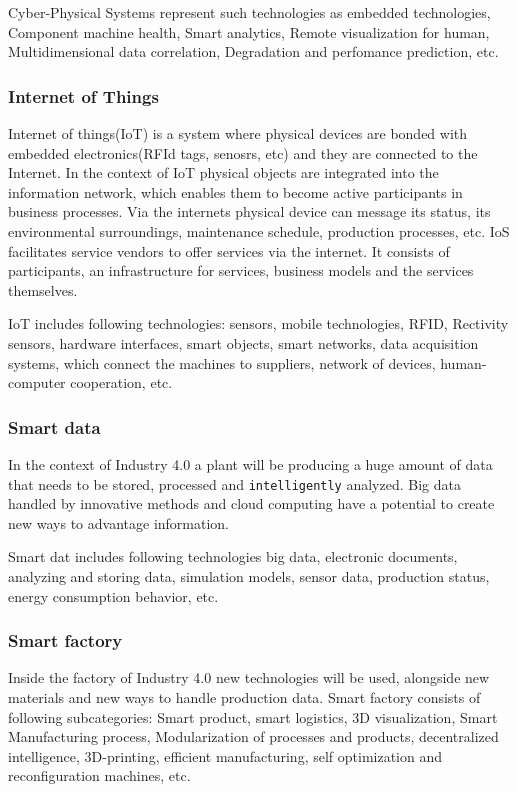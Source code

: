 \documentclass[thesis=B,english]{FITthesis}[2019/12/23]
\begin{document}
Cyber-Physical Systems represent such technologies as embedded technologies, Component machine health, Smart analytics, Remote visualization for human, Multidimensional data correlation, Degradation and perfomance prediction, etc.

\subsubsection{Internet of Things}

Internet of things(IoT) is a system where physical devices are bonded with embedded electronics(RFId tags, senosrs, etc) and they are connected to the Internet. In the context of IoT physical objects are integrated into the information network, which enables them to become active participants in business processes. Via the internets physical device can message its status, its environmental surroundings, maintenance schedule, production processes, etc. IoS facilitates service vendors to offer  services via the internet. It consists of participants, an infrastructure for services, business models and the services themselves.  

IoT includes following technologies: sensors, mobile technologies, RFID, Rectivity sensors, hardware interfaces, smart objects, smart networks, data acquisition systems, which connect the machines to suppliers, network of devices, human-computer cooperation, etc. 

\subsubsection{Smart data}

In the context of Industry 4.0 a plant will be producing a huge amount of data that needs to be stored, processed and \verb|intelligently| analyzed. Big data handled by innovative methods and cloud computing have a potential to create new ways to advantage information.

Smart dat includes following technologies big data, electronic documents, analyzing and storing data, simulation models, sensor data, production status, energy consumption behavior, etc. 

\subsubsection{Smart factory}

Inside the factory of Industry 4.0 new technologies will be used, alongside new materials and new ways to handle production data. Smart factory consists of following subcategories: Smart product, smart logistics, 3D visualization, Smart Manufacturing process, Modularization of processes and products, decentralized intelligence, 3D-printing, efficient manufacturing, self optimization and reconfiguration machines, etc. \cite{bib_5}  
\end{document}
